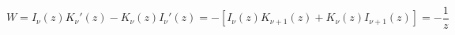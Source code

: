 \documentclass[12pt]{article}
\begin{document}
\begin{displaymath}
W = I_\nu(z)K_\nu'(z) - K_\nu(z)I_\nu'(z)
  = -\left[I_\nu(z)K_{\nu+1}(z) + K_\nu(z)I_{\nu+1}(z)\right]
  = -\frac{1}{z}
\end{displaymath}
\end{document}
